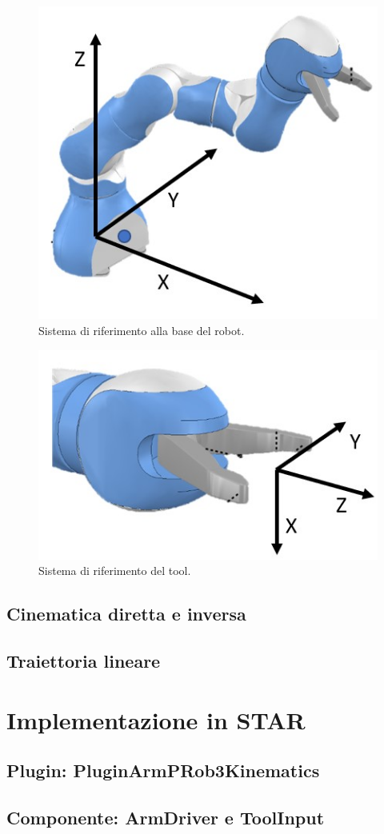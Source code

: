 \begin{figure}[tbh]
	\centering
	\includegraphics[width=0.5\linewidth]{./ImageFiles/prob_frame_base}
	\caption{Sistema di riferimento alla base del robot.}
	\label{fig:base_frame}
\end{figure}

\begin{figure}[tbh]
	\centering
	\includegraphics[width=0.5\linewidth]{./ImageFiles/prob_frame_tool.jpg}
	\caption{Sistema di riferimento del tool.}
	\label{fig:tool_frame}
\end{figure}

\section{Cinematica diretta e inversa}
\section{Traiettoria lineare}


\chapter{Implementazione in STAR} 
\section{Plugin: PluginArmPRob3Kinematics}
\section{Componente: ArmDriver e ToolInput}
